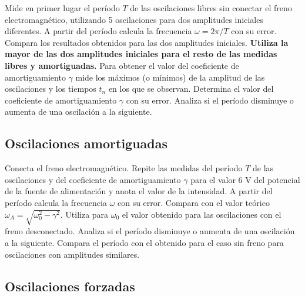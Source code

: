 \documentclass[11pt]{articulo}
\begin{document}
Mide en primer lugar el per\'iodo $T$ de las oscilaciones libres sin conectar el freno electromagn\'etico, utilizando 5 oscilaciones para dos amplitudes iniciales diferentes. A partir del per\'iodo calcula la frecuencia $\omega = 2\pi/T$ con su error. Compara los resultados obtenidos para las dos amplitudes iniciales. {\bf Utiliza la mayor de las dos amplitudes iniciales para el resto de las medidas libres y amortiguadas.} Para obtener el valor del coeficiente de amortiguamiento $\gamma$ mide los m\'aximos (o m\'inimos) de la amplitud de las oscilaciones y los tiempos $t_n$ en los que se observan. Determina el valor del coeficiente de amortiguamiento $\gamma$ con su error. Analiza si el per\'iodo disminuye o aumenta de una oscilaci\'on a la siguiente.

\subsection{Oscilaciones amortiguadas}

Conecta el freno electromagn\'etico. Repite las medidas del per\'iodo $T$ de las oscilaciones y del coeficiente de amortiguamiento $\gamma$ para el valor 6 V del potencial de la fuente de alimentaci\'on y anota el valor de la intensidad. A partir del per\'iodo calcula la frecuencia $\omega$ con su error. Compara con el valor te\'orico $\omega_A = \sqrt{\omega_0^2 - \gamma^2}$. Utiliza para $\omega_0$ el valor obtenido para las oscilaciones con el freno desconectado. Analiza si el per\'iodo disminuye o aumenta de una oscilaci\'on a la siguiente. Compara el per\'iodo con el obtenido para el caso sin freno para oscilaciones con amplitudes similares.

\subsection{Oscilaciones forzadas}
\end{document}
